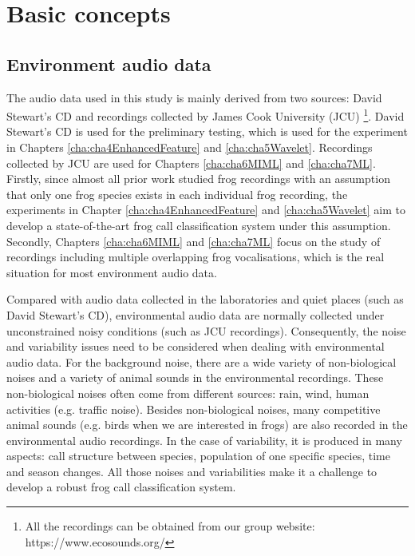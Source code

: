 \section{Basic concepts} 

\subsection{Environment audio data}
The audio data used in this study is mainly derived from two sources: David Stewart's CD \citep{CD} and recordings collected by James Cook University (JCU) \footnote{All the recordings can be obtained from our group website: https://www.ecosounds.org/}. David Stewart's CD is used for the preliminary testing, which is used for the experiment in Chapters \ref{cha:cha4EnhancedFeature} and \ref{cha:cha5Wavelet}. Recordings collected by JCU are used for Chapters \ref{cha:cha6MIML} and \ref{cha:cha7ML}. Firstly, since almost all prior work studied frog recordings with an assumption that only one frog species exists in each individual frog recording, the experiments in Chapter \ref{cha:cha4EnhancedFeature} and \ref{cha:cha5Wavelet} aim to develop a state-of-the-art frog call classification system under this assumption. Secondly, Chapters \ref{cha:cha6MIML} and \ref{cha:cha7ML} focus on the  
study of recordings including multiple overlapping frog vocalisations, which is the real situation for most environment audio data. 


Compared with audio data collected in the laboratories and quiet places (such as David Stewart’s CD), environmental audio data are normally collected under unconstrained noisy conditions (such as JCU recordings). Consequently, the noise and variability issues need to be considered when dealing with environmental audio data. For the background noise, there are a wide variety of non-biological noises and a variety of animal sounds in the environmental recordings. These non-biological noises often come from different sources: rain, wind, human activities (e.g. traffic noise). Besides non-biological noises, many competitive animal sounds (e.g. birds when we are interested in frogs) are also recorded in the environmental audio recordings. In the case of variability, it is produced in many aspects: call structure between species, population of one specific species, time and season changes. All those noises and variabilities make it a challenge to develop a robust frog call classification system.





